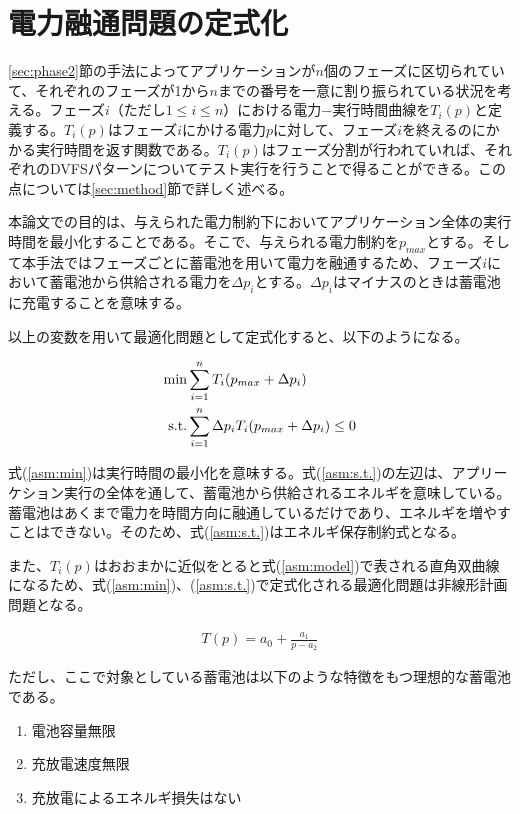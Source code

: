 \section{電力融通問題の定式化}
\label{sec:formularization}

\ref{sec:phase2}節の手法によってアプリケーションが$n$個のフェーズに区切られていて、それぞれのフェーズが1から$n$までの番号を一意に割り振られている状況を考える。フェーズ$i$（ただし$1\leq i\leq n$）における電力−実行時間曲線を$T_i(p)$と定義する。$T_i(p)$はフェーズ$i$にかける電力$p$に対して、フェーズ$i$を終えるのにかかる実行時間を返す関数である。$T_i(p)$はフェーズ分割が行われていれば、それぞれのDVFSパターンについてテスト実行を行うことで得ることができる。この点については\ref{sec:method}節で詳しく述べる。

本論文での目的は、与えられた電力制約下においてアプリケーション全体の実行時間を最小化することである。そこで、与えられる電力制約を$p_{max}$とする。そして本手法ではフェーズごとに蓄電池を用いて電力を融通するため、フェーズ$i$において蓄電池から供給される電力を$\Delta p_i$とする。$\Delta p_i$はマイナスのときは蓄電池に充電することを意味する。

以上の変数を用いて最適化問題として定式化すると、以下のようになる。

\begin{eqnarray}
{\rm min } & \sum_{i=1}^n T_i(p_{max} + \Delta p_i) \label{asm:min} \\
{\rm s.t. } & \sum_{i=1}^n \Delta p_i T_i(p_{max} + \Delta p_i) \leq 0 \label{asm:s.t.}
\end{eqnarray}

式(\ref{asm:min})は実行時間の最小化を意味する。式(\ref{asm:s.t.})の左辺は、アプリーケション実行の全体を通して、蓄電池から供給されるエネルギを意味している。蓄電池はあくまで電力を時間方向に融通しているだけであり、エネルギを増やすことはできない。そのため、式(\ref{asm:s.t.})はエネルギ保存制約式となる。

また、$T_i(p)$はおおまかに近似をとると式(\ref{asm:model})で表される直角双曲線になるため、式(\ref{asm:min})、(\ref{asm:s.t.})で定式化される最適化問題は非線形計画問題となる。

\begin{eqnarray}
T(p) = a_0 + \frac{a_1}{p-a_2} \label{asm:model}
\end{eqnarray}

ただし、ここで対象としている蓄電池は以下のような特徴をもつ理想的な蓄電池である。

\begin{enumerate}
\item 電池容量無限
\item 充放電速度無限
\item 充放電によるエネルギ損失はない
\end{enumerate}

